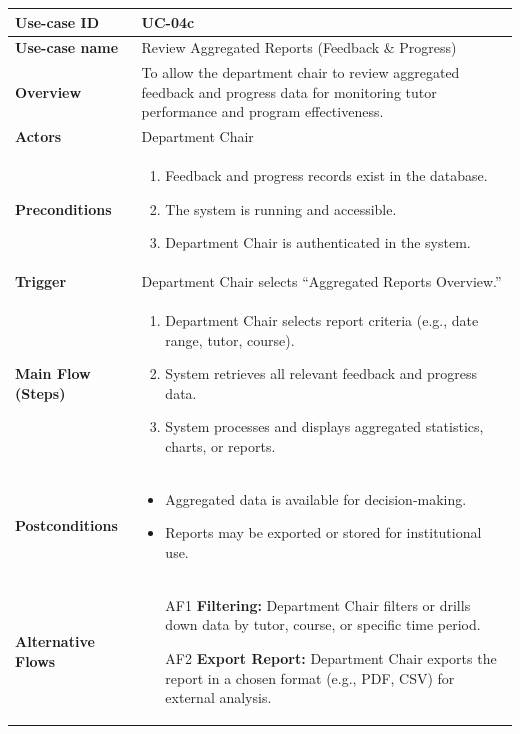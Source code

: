 \begin{center}
\begin{longtable}{|p{3cm}|p{11cm}|}
\hline
\textbf{Use-case ID} & UC-04c \\ 
\hline
\textbf{Use-case name} & Review Aggregated Reports (Feedback \& Progress) \\ 
\hline
\textbf{Overview} & To allow the department chair to review aggregated feedback and progress data for monitoring tutor performance and program effectiveness. \\ 
\hline
\textbf{Actors} & Department Chair \\ 
\hline
\textbf{Preconditions} & 
\begin{enumerate}
    \item Feedback and progress records exist in the database.
    \item The system is running and accessible.
    \item Department Chair is authenticated in the system.
\end{enumerate} \\ 
\hline
\textbf{Trigger} & Department Chair selects ``Aggregated Reports Overview.'' \\ 
\hline
\textbf{Main Flow (Steps)} & 
\begin{enumerate}
    \item Department Chair selects report criteria (e.g., date range, tutor, course).
    \item System retrieves all relevant feedback and progress data.
    \item System processes and displays aggregated statistics, charts, or reports.
\end{enumerate} \\ 
\hline
\textbf{Postconditions} & 
\begin{itemize}
    \item Aggregated data is available for decision-making.
    \item Reports may be exported or stored for institutional use.
\end{itemize} \\ 
\hline
\textbf{Alternative Flows} & 
\begin{itemize}
    \item[AF1] \textbf{Filtering:} Department Chair filters or drills down data by tutor, course, or specific time period.
    \item[AF2] \textbf{Export Report:} Department Chair exports the report in a chosen format (e.g., PDF, CSV) for external analysis.

\end{itemize}
\end{longtable}
\end{center}

